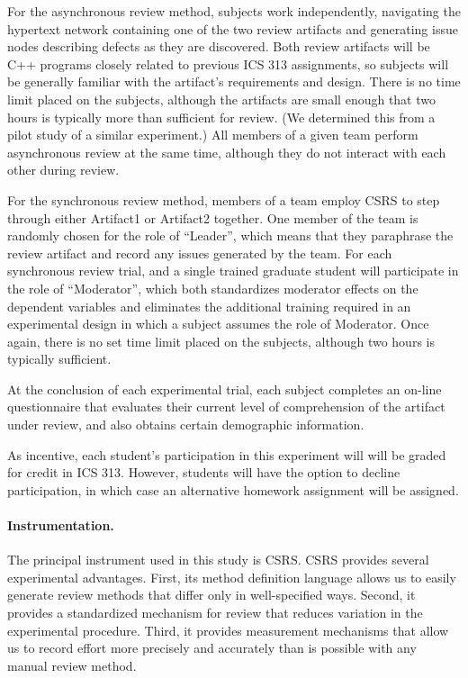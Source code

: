 For the asynchronous review method, subjects work independently, navigating
the hypertext network containing one of the two review artifacts and
generating issue nodes describing defects as they are discovered.  Both
review artifacts will be C++ programs closely related to previous ICS 313
assignments, so subjects will be generally familiar with the artifact's
requirements and design. There is no time limit placed on the subjects,
although the artifacts are small enough that two hours is typically more
than sufficient for review.  (We determined this from a pilot study of a
similar experiment.)  All members of a given team perform asynchronous
review at the same time, although they do not interact with each other
during review.

For the synchronous review method, members of a team employ CSRS to step
through either Artifact1 or Artifact2 together.  One member of the team is
randomly chosen for the role of ``Leader'', which means that they
paraphrase the review artifact and record any issues generated by the team.
For each synchronous review trial, and a single trained graduate student will
participate in the role of ``Moderator'', which both standardizes moderator
effects on the dependent variables and eliminates the additional training
required in an experimental design in which a subject assumes the role of
Moderator.  Once again, there is no set time limit placed on the subjects,
although two hours is typically sufficient.

At the conclusion of each experimental trial, each subject completes an
on-line questionnaire that evaluates their current level of comprehension
of the artifact under review, and also obtains certain demographic
information.

As incentive, each student's participation in this experiment will will be
graded for credit in ICS 313.  However, students will have the option to
decline participation, in which case an alternative homework assignment
will be assigned.

\paragraph {Instrumentation.}

The principal instrument used in this study is CSRS.  CSRS provides several
experimental advantages.  First, its method definition language allows us
to easily generate review methods that differ only in well-specified ways.
Second, it provides a standardized mechanism for review that reduces
variation in the experimental procedure.  Third, it provides measurement
mechanisms that allow us to record effort more precisely and accurately
than is possible with any manual review method. 

